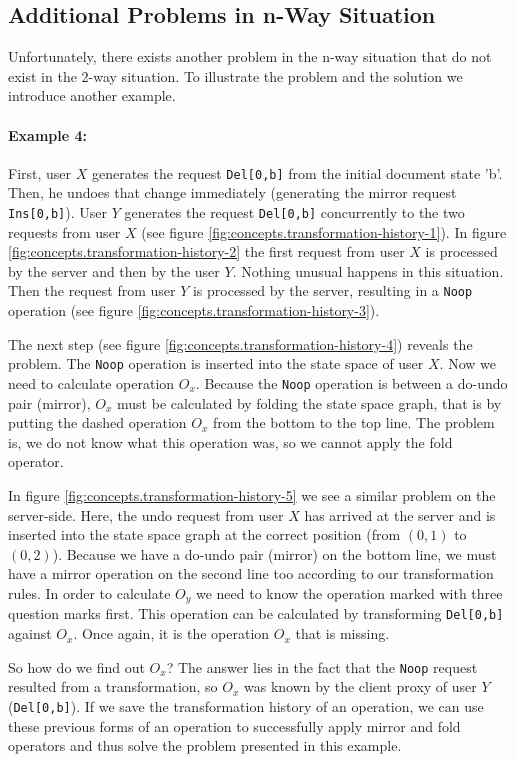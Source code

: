 \subsection{Additional Problems in n-Way Situation}
Unfortunately, there exists another problem in the n-way situation that do not exist in the 2-way situation. To illustrate the problem and the solution we introduce another example.

\paragraph{Example 4:} First, user $X$ generates the request \texttt{Del[0,b]} from the initial document state 'b'. Then, he undoes that change immediately (generating the mirror request \texttt{Ins[0,b]}). User $Y$ generates the request \texttt{Del[0,b]} concurrently to the two requests from user $X$ (see figure \ref{fig:concepts.transformation-history-1}). In figure \ref{fig:concepts.transformation-history-2} the first request from user $X$ is processed by the server and then by the user $Y$. Nothing unusual happens in this situation. Then the request from user $Y$ is processed by the server, resulting in a \texttt{Noop} operation (see figure \ref{fig:concepts.transformation-history-3}).

The next step (see figure \ref{fig:concepts.transformation-history-4}) reveals the problem. The \texttt{Noop} operation is inserted into the state space of user $X$. Now we need to calculate operation $O_{x}$. Because the \texttt{Noop} operation is between a do-undo pair (mirror), $O_{x}$ must be calculated by folding the state space graph, that is by putting the dashed operation $O_{x}$ from the bottom to the top line. The problem is, we do not know what this operation was, so we cannot apply the fold operator.

In figure \ref{fig:concepts.transformation-history-5} we see a similar problem on the server-side. Here, the undo request from user $X$ has arrived at the server and is inserted into the state space graph at the correct position (from $(0,1)$ to $(0,2)$). Because we have a do-undo pair (mirror) on the bottom line, we must have a mirror operation on the second line too according to our transformation rules. In order to calculate $O_{y}$ we need to know the operation marked with three question marks first. This operation can be calculated by transforming \texttt{Del[0,b]} against $O_{x}$. Once again, it is the operation $O_{x}$ that is missing.

So how do we find out $O_{x}$? The answer lies in the fact that the \texttt{Noop} request resulted from a transformation, so $O_{x}$ was known by the client proxy of user $Y$ (\texttt{Del[0,b]}). If we save the transformation history of an operation, we can use these previous forms of an operation to successfully apply mirror and fold operators and thus solve the problem presented in this example.

